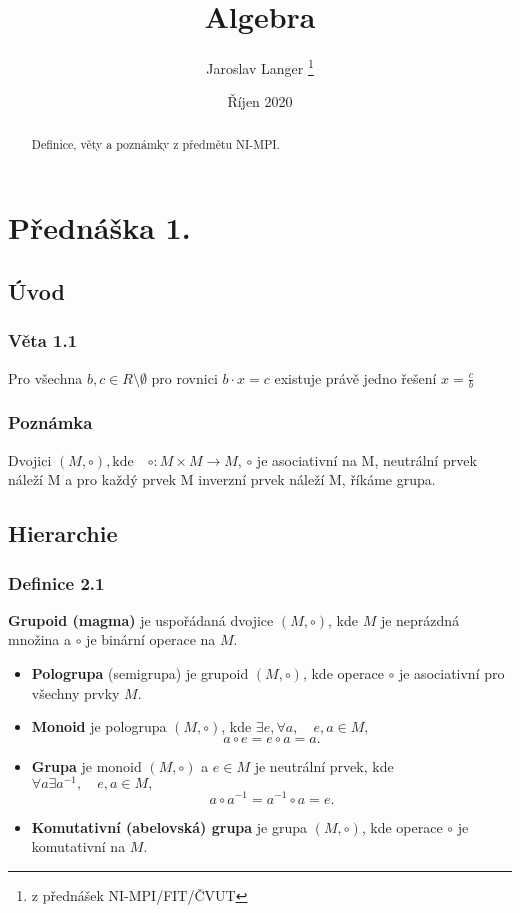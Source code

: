 \documentclass[12pt, letterpaper]{article}
\title{Algebra}
\author{Jaroslav Langer \thanks{z přednášek NI-MPI/FIT/ČVUT}}
\date{Říjen 2020}
\begin{document}
\maketitle

\tableofcontents

\begin{abstract}
Definice, věty a poznámky z předmětu NI-MPI.
\end{abstract}

\section{Přednáška 1.}

\subsection{Úvod}

\subsubsection*{Věta 1.1}
Pro všechna $b,c \in R \setminus \emptyset$ pro rovnici $b \cdot x = c$ existuje právě jedno řešení $x = \frac{c}{b}$

\subsubsection*{Poznámka}
Dvojici $(M, \circ), \textrm{kde} \quad \circ: M \times M \to M$,
$\circ$ je asociativní na M, neutrální prvek náleží M a pro každý prvek M inverzní prvek náleží M, říkáme grupa.

\subsection{Hierarchie}

\subsubsection*{Definice 2.1}
\textbf{Grupoid (magma)} je uspořádaná dvojice $(M, \circ)$,
kde $M$ je neprázdná množina a $\circ$ je binární operace na $M$.
\begin{itemize}
    \item \textbf{Pologrupa} (semigrupa) je grupoid $(M, \circ)$,
        kde operace $\circ$ je asociativní pro všechny prvky $M$.
    \item \textbf{Monoid} je pologrupa $(M, \circ)$,
        kde $\exists e, \forall a, \quad e,a \in M,$ \[a \circ e = e \circ a = a.\]
    \item \textbf{Grupa} je monoid $(M, \circ)$ a $e \in M$ je neutrální prvek,
        kde $\forall a \exists a^{-1}, \quad e,a \in M,$ \[a \circ a^{-1} = a^{-1} \circ a = e.\]
    \item \textbf{Komutativní (abelovská) grupa} je grupa $(M, \circ)$,
        kde operace $\circ$ je komutativní na $M$.
\end{itemize}
\end{document}
